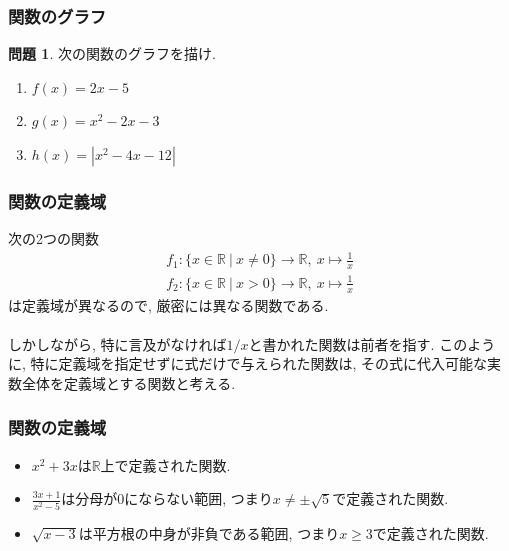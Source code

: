 \documentclass[dvipdfmx,cjk,10.2pt]{beamer}
\newcommand{\R}{\mathbb{R}}
\theoremstyle{definition}
\newtheorem{Prob}[Thm]{問題}
\begin{document}
\begin{frame}
\frametitle{関数のグラフ}   


\begin{Prob}
次の関数のグラフを描け. 
\begin{enumerate}
\item $f(x)=2x-5$
\item $g(x)=x^2-2x-3$
\item $h(x)=|x^2-4x-12|$
\end{enumerate}
\end{Prob}


\end{frame}







\begin{frame}
\frametitle{関数の定義域}

次の2つの関数
\begin{align*}
f_1: \{ x \in \R \ | \ x \neq 0\} \longrightarrow \R, \ x \mapsto \frac{1}{x}\\
f_2: \{ x \in \R \ | \ x > 0\} \longrightarrow \R, \ x \mapsto \frac{1}{x}
\end{align*}
は定義域が異なるので, 厳密には異なる関数である. \\
\ \\

しかしながら, 特に言及がなければ$1/x$と書かれた関数は前者を指す. 
このように, 特に定義域を指定せずに式だけで与えられた関数は, その式に代入可能な実数全体を定義域とする関数と考える.


\end{frame}




\begin{frame}
\frametitle{関数の定義域}

\begin{itemize}
\item $x^2 + 3x$は$\R$上で定義された関数. 
\item $\frac{3x+1}{x^2-5}$は分母が$0$にならない範囲, つまり$x\neq \pm \sqrt{5}$で定義された関数. 
\item $\sqrt{x-3}$は平方根の中身が非負である範囲, つまり$x\ge 3$で定義された関数. 
\end{itemize}

\end{frame}
\end{document}
